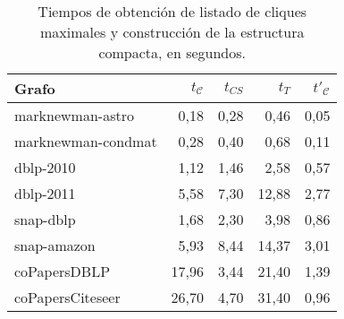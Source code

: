 \begin{table}
	\caption{Tiempos de obtención de listado de cliques maximales y construcción de la estructura compacta, en segundos.}
	\label{table:constructTimes}
	\centering
	\begin{tabular}{l|r|r|r|r}
		\toprule
		Grafo & $t_{\mathcal{C}}$ & $t_{CS}$ & $t_{T}$ & $t'_{\mathcal{C}}$ \\
		\midrule
		marknewman-astro & 0,18 & 0,28 & 0,46 & 0,05  \\
		marknewman-condmat & 0,28 & 0,40 & 0,68 & 0,11 \\
		dblp-2010 & 1,12 & 1,46 & 2,58 & 0,57  \\
         dblp-2011 & 5,58 & 7,30 & 12,88 & 2,77 \\
		snap-dblp & 1,68 & 2,30 & 3,98 & 0,86 \\
         snap-amazon & 5,93 & 8,44 & 14,37 & 3,01 \\
         coPapersDBLP & 17,96 & 3,44 & 21,40 & 1,39 \\
         coPapersCiteseer & 26,70 & 4,70 & 31,40 & 0,96 \\
         \bottomrule
	\end{tabular}
\end{table}